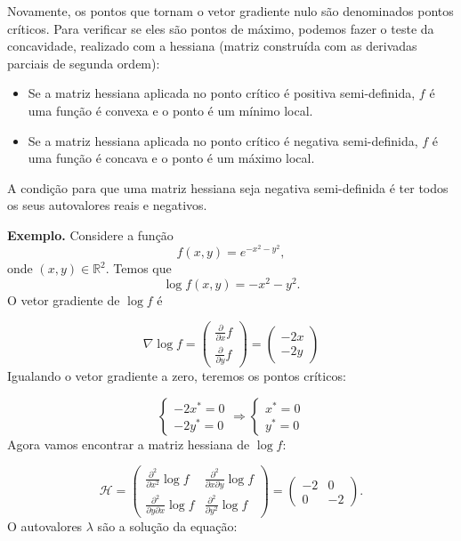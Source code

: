 \documentclass[
  letterpaper,
  DIV=11,
  numbers=noendperiod]{scrartcl}
\begin{document}
Novamente, os pontos que tornam o vetor gradiente nulo são denominados
pontos críticos. Para verificar se eles são pontos de máximo, podemos
fazer o teste da concavidade, realizado com a hessiana (matriz
construída com as derivadas parciais de segunda ordem):

\begin{itemize}
\item
  Se a matriz hessiana aplicada no ponto crítico é positiva
  semi-definida, \(f\) é uma função é convexa e o ponto é um mínimo
  local.
\item
  Se a matriz hessiana aplicada no ponto crítico é negativa
  semi-definida, \(f\) é uma função é concava e o ponto é um máximo
  local.
\end{itemize}

A condição para que uma matriz hessiana seja negativa semi-definida é
ter todos os seus autovalores reais e negativos.

\textbf{Exemplo.} Considere a função \[f(x,y)=e^{-x^2 - y^2},\] onde
\((x,y)\in\mathbb{R}^2\). Temos que \[\log f(x,y)=-x^2 - y^2.\] O vetor
gradiente de \(\log f\) é

\[\nabla\log f=\left(\begin{array}{c}\frac{\partial}{\partial x}f \\ \frac{\partial}{\partial y}f\end{array}\right)=\left(\begin{array}{c} -2x \\ -2y\end{array}\right)\]
Igualando o vetor gradiente a zero, teremos os pontos críticos:

\[\left\{\begin{array}{c} -2x^*=0 \\ -2y^*=0\end{array}\right.\Rightarrow\left\{\begin{array}{c} x^*=0 \\ y^*=0\end{array}\right.\]
Agora vamos encontrar a matriz hessiana de \(\log f\):

\[\mathcal{H}=\left(\begin{array}{cc}\frac{\partial^2}{\partial x^2}\log f & \frac{\partial^2}{\partial x\partial y}\log f\\  \frac{\partial^2}{\partial y \partial x}\log f & \frac{\partial^2}{\partial y^2}\log f\end{array}\right)=\left(\begin{array}{cc}-2&0\\0&-2\end{array}\right).\]
O autovalores \(\lambda\) são a solução da equação:
\end{document}
